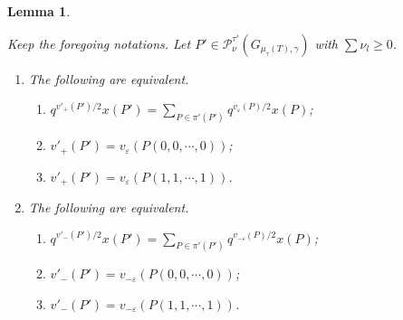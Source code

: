 \documentclass[10pt]{amsart}
\theoremstyle{theorems}
\newtheorem{Lemma}[Theorem]{Lemma}
\begin{document}
\medskip

\begin{Lemma}\label{induction}

Keep the foregoing notations. Let $P'\in \mathcal P^{\tau'}_{\nu}(G_{\mu_{\tau}(T),\gamma})$ with $\sum \nu_l\geq 0$.

\begin{enumerate}[$(1)$]

  \item The following are equivalent.

  \begin{enumerate}[$(a)$]

  \item $q^{v'_{+}(P')/2}x(P')=\sum_{P\in \pi'(P')}q^{v_{\varepsilon}(P)/2}x(P)$;

  \item $v'_{+}(P')=v_{\varepsilon}(P(0,0,\cdots,0))$;

  \item $v'_{+}(P')=v_{\varepsilon}(P(1,1,\cdots,1))$.

  \end{enumerate}

  \item The following are equivalent.

  \begin{enumerate}[$(a)$]

  \item $q^{v'_{-}(P')/2}x(P')=\sum_{P\in \pi'(P')}q^{v_{-\varepsilon}(P)/2}x(P)$;

  \item $v'_{-}(P')=v_{-\varepsilon}(P(0,0,\cdots,0))$;

  \item $v'_{-}(P')=v_{-\varepsilon}(P(1,1,\cdots,1))$.

\end{enumerate}

\end{enumerate}

\end{Lemma}
\end{document}
